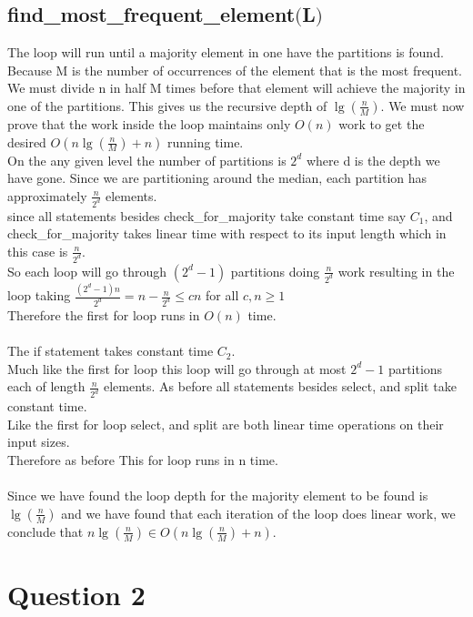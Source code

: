 \documentclass{article}
\begin{document}
      \subsection{find\_most\_frequent\_element$($L$)$}
        The loop will run until a majority element in one have the partitions is found. Because M is the number of occurrences of the element that is the most frequent. We must divide n in half M times before that element will achieve the majority in one of the partitions. This gives us the recursive depth of $\lg(\frac{n}{M})$. 
        We must now prove that the work inside the loop maintains only $O(n)$ work to get the desired $O(n\lg(\frac{n}{M}) + n)$ running time. \\
        On the any given level the number of partitions is $2^{d}$ where d is the depth we have gone. Since we are partitioning around the median, each partition has approximately $\frac{n}{2^{d}}$ elements. \\
        since all statements besides check\_for\_majority take constant time say $C_{1}$, and check\_for\_majority takes linear time with respect to its input length which in this case is $\frac{n}{2^{d}}$. \\
        So each loop will go through $(2^{d} - 1)$ partitions doing $\frac{n}{2^{d}}$ work resulting in the loop taking $\frac{(2^{d} - 1)n}{2^{d}} = n - \frac{n}{2^{d}} \leq cn$ for all $c, n \geq 1$ \\
        Therefore the first for loop runs in $O(n)$ time. \\
        \\
        The if statement takes constant time $C_{2}$. \\
        Much like the first for loop this loop will go through at most $2^{d} - 1$ partitions each of length $\frac{n}{2^{d}}$ elements.
        As before all statements besides select, and split take constant time. \\
        Like the first for loop select, and split are both linear time operations on their input sizes. \\
        Therefore as before This for loop runs in n time. \\
        \\
        Since we have found the loop depth for the majority element to be found is $\lg(\frac{n}{M})$ and we have found that each iteration of the loop does linear work, we conclude that $n\lg(\frac{n}{M}) \in O(n\lg(\frac{n}{M}) + n)$.
  \section{Question 2}
\end{document}
